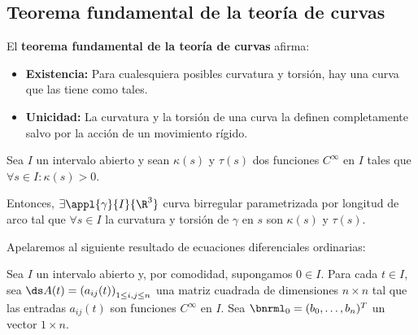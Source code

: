 \subsection{Teorema fundamental de la teoría de curvas}

El \textbf{teorema fundamental de la teoría de curvas} afirma:
\begin{itemize}
	\item \textbf{Existencia:} Para cualesquiera posibles curvatura y torsión, hay una curva que las tiene como tales.
	\item \textbf{Unicidad:} La curvatura y la torsión de una curva la definen completamente salvo por la acción de un movimiento rígido.
\end{itemize}

\begin{teo}[Existencia]
	Sea $I$ un intervalo abierto y sean $\kappa (s)$ y $\tau (s)$ dos funciones $C^{\infty}$ en $I$ tales que $\forall s \in I : \kappa (s) >0$.

	Entonces, $\exists \appl{\gamma}{I}{\R^3}$ curva birregular parametrizada por longitud de arco tal que $\forall s \in I$ la curvatura y torsión de $\gamma$ en $s$ son $\kappa(s)$ y $\tau(s)$.
	\begin{dem}
		Apelaremos al siguiente resultado de ecuaciones diferenciales ordinarias: \vspace{-0.5cm}
		\begin{lem}
			Sea $I$ un intervalo abierto y, por comodidad, supongamos $0\in I$. Para cada $t\in I$, sea $\ds A(t)=\left(a_{ij}(t)\right)_{1\leq i, j\leq n}$ una matriz cuadrada de dimensiones $n\times n$ tal que las entradas $a_{ij}(t)$ son funciones $C^\infty$ en $I$. Sea $\bnrml_0 = (b_0, \dots, b_n)^T$ un vector $1\times n$.


\end{lem}
\end{dem}
\end{teo}
